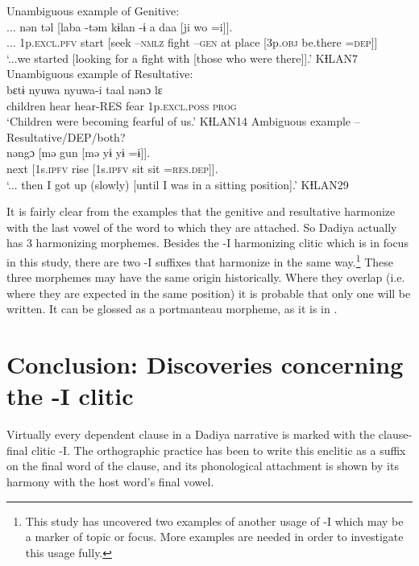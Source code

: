 \documentclass[output=paper]{langscibook}
\begin{document}
\ea Unambiguous example of Genitive:
\label{ex:dettweiler:KƗLAN7} \\
\gll ... nən təl [laba -təm kɨlan -ɨ a daa [ji wo =i]]. \\
... 1p.\textsc{excl}.\textsc{pfv} start [seek –\textsc{nmlz} fight –\textsc{gen} at place [3p.\textsc{obj} be.there =\textsc{dep}]] \\
\glt `...we started [looking for a fight with [those who were there]].' KƗLAN7
\ex Unambiguous example of Resultative:
\label{ex:dettweiler:KƗLAN14} \\
\gll bɛtɨ nyuwa nyuwa-i taal nənɔ lɛ \\
children hear hear-RES fear 1p.\textsc{excl}.\textsc{poss} \textsc{prog} \\
\glt `Children were becoming fearful of us.' KƗLAN14
\ex Ambiguous example -- Resultative/DEP/both?
\label{ex:dettweiler:KƗLAN29} \\
\gll nəngɔ [mə gun [mə yɨ yɨ =ɨ]]. \\
next [1s.\textsc{ipfv} rise [1s.\textsc{ipfv} sit sit =\textsc{res}.\textsc{dep}]]. \\
\glt `... then I got up (slowly) [until I was in a sitting position].' KƗLAN29
\z

\noindent It is fairly clear from the examples that the genitive and resultative harmonize with the last vowel of the word to which they are attached. So Dadiya actually has 3 harmonizing morphemes. Besides the -I harmonizing clitic which is in focus in this study, there are two -I suffixes that harmonize in the same way.\footnote{This study has uncovered two examples of another usage of -I which may be a marker of topic or focus. More examples are needed in order to investigate this usage fully.} These three morphemes may have the same origin historically. Where they overlap (i.e. where they are expected in the same position) it is probable that only one will be written. It can be glossed as a portmanteau morpheme, as it is in .

\section{Conclusion: Discoveries concerning the -I clitic}

Virtually every dependent clause in a Dadiya narrative is marked with the clause-final clitic -I. The orthographic practice has been to write this enclitic as a suffix on the final word of the clause, and its phonological attachment is shown by its harmony with the host word's final vowel.
\end{document}
